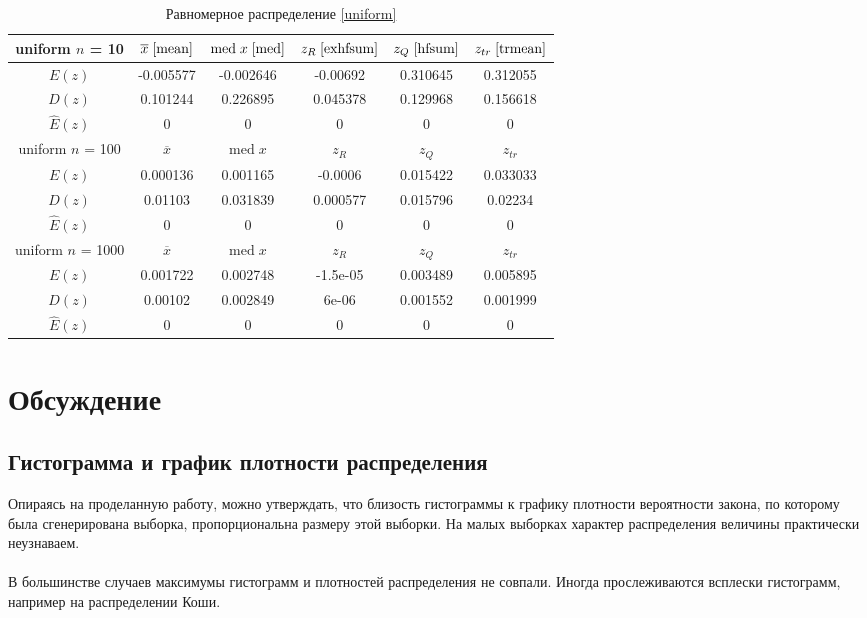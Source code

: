 \documentclass[a4paper,12pt]{article} %
\begin{document}
\begin{table}[H]
    \centering
    \begin{tabular}{|c|c|c|c|c|c|}
        \hline
         uniform $n$ = 10&$\overline{x}\;\eqref{mean}$&$\mathrm{med}\;x\;\eqref{med}$&$z_R\;\eqref{exhfsum}$&$z_Q\;\eqref{hfsum}$&$z_{tr}\;\eqref{trmean}$\\
        \hline
        $E(z)$&-0.005577&-0.002646&-0.00692&0.310645&0.312055\\
        \hline
        $D(z)$&0.101244&0.226895&0.045378&0.129968&0.156618\\
        \hline
        $\hat{E}(z)$&0&0&0&0&0\\
        \hline
        uniform $n$ = 100&$\overline{x}$&$\mathrm{med}\;x$&$z_R$&$z_Q$&$z_{tr}$\\
        \hline
        $E(z)$&0.000136&0.001165&-0.0006&0.015422&0.033033\\
        \hline
        $D(z)$&0.01103&0.031839&0.000577&0.015796&0.02234\\
        \hline
        $\hat{E}(z)$&0&0&0&0&0\\
        \hline
        uniform $n$ = 1000 &$\overline{x}$&$\mathrm{med}\;x$&$z_R$&$z_Q$&$z_{tr}$\\
        \hline
        $E(z)$&0.001722&0.002748&-1.5e-05&0.003489&0.005895\\
        \hline
        $D(z)$&0.00102&0.002849&6e-06&0.001552&0.001999\\
        \hline
        $\hat{E}(z)$&0&0&0&0&0\\
        \hline
    \end{tabular}
    \caption{Равномерное распределение \eqref{uniform}}
    \label{tab:uniform}
\end{table}
\section{Обсуждение}
\subsection{Гистограмма и график плотности распределения}
Опираясь на проделанную работу, можно утверждать, что близость гистограммы к графику плотности вероятности закона, по которому была сгенерирована выборка, пропорциональна размеру этой выборки. На малых выборках характер распределения величины практически неузнаваем.\\
\\
В большинстве случаев максимумы гистограмм и плотностей распределения не совпали. Иногда прослеживаются всплески гистограмм, например на распределении Коши.
\end{document}
